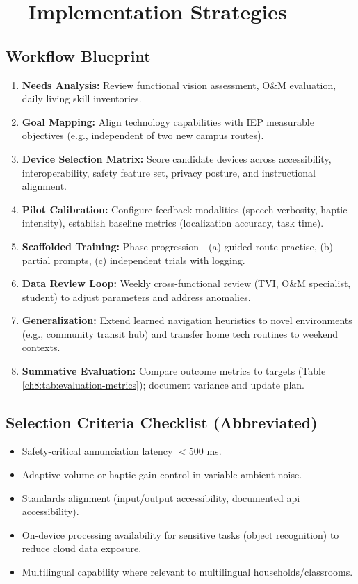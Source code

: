 \section{~~Implementation Strategies}\label{ch8:sec:implementation-strategies}

\subsection{Workflow Blueprint}
\begin{enumerate}
	\item \textbf{Needs Analysis:} Review functional vision assessment, O\&M evaluation, daily living skill inventories.\supercite{Holbrook2006, OrientationMobilityInstruction}
	\item \textbf{Goal Mapping:} Align technology capabilities with IEP measurable objectives (e.g., independent  of two new campus routes).\supercite{IDEA2004}
	\item \textbf{Device Selection Matrix:} Score candidate devices across accessibility, interoperability, safety feature set, privacy posture, and instructional alignment.
	\item \textbf{Pilot Calibration:} Configure feedback modalities (speech verbosity, haptic intensity), establish baseline metrics (localization accuracy, task time).
	\item \textbf{Scaffolded Training:} Phase progression—(a) guided route practise, (b) partial prompts, (c) independent trials with logging.
	\item \textbf{Data Review Loop:} Weekly cross-functional review (TVI, O\&M specialist, student) to adjust parameters and address anomalies.
	\item \textbf{Generalization:} Extend learned navigation heuristics to novel environments (e.g., community transit hub) and transfer home tech routines to weekend contexts.
	\item \textbf{Summative Evaluation:} Compare outcome metrics to targets (Table \ref{ch8:tab:evaluation-metrics}); document variance and update plan.
\end{enumerate}

\subsection{Selection Criteria Checklist (Abbreviated)}
\begin{itemize}
	\item Safety-critical annunciation latency $< 500$ ms.\supercite{InclusiveCityMaker2023}
	\item Adaptive volume or haptic gain control in variable ambient noise.
	\item Standards alignment (input/output accessibility, documented \gls{api} accessibility).
	\item On-device processing availability for sensitive tasks (object recognition) to reduce cloud data exposure.\supercite{DataPrivacyAI}
	\item Multilingual capability where relevant to multilingual households/classrooms.
\end{itemize}

